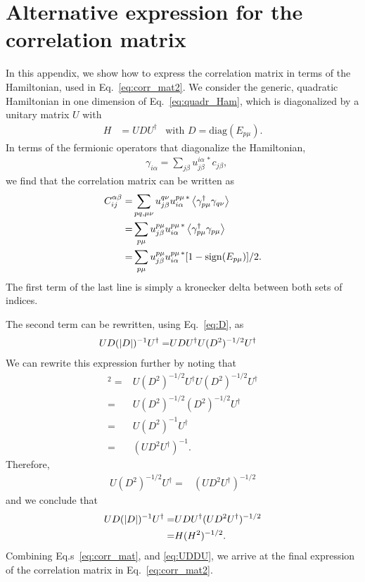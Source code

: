 \documentclass[twocolumn,amsmath,longbibliography,amssymb,superscriptaddress]{revtex4-1}
\begin{document}
\section{Alternative expression for the correlation matrix}\label{app:CM}
In this appendix, we show how to express the correlation matrix in terms of the Hamiltonian, used in Eq.~\eqref{eq:corr_mat2}. 
We consider the generic, quadratic Hamiltonian in one dimension of Eq.~\ref{eq:quadr_Ham}, which is diagonalized by a unitary matrix $U$ with 
	\begin{align}\label{eq:D}
	H&=UDU^\dagger& \mbox{with } D=\mbox{diag}(E_{p\mu}).
	\end{align} 
In terms of the fermionic operators that diagonalize the Hamiltonian, 
\begin{align}
& \gamma_{i\alpha} = \sum_{j\beta}u_{j\beta}^{i\alpha \, \ast} c_{j\beta},
\end{align}
we find that the correlation matrix can be written as 
\begin{align}\label{eq:corr_mat}
C_{ij}^{\alpha \beta} =& \sum_{pq,\mu\nu} u^{q\nu }_{j\beta} u^{p\mu \, \ast}_{i\alpha} \expval{\gamma^\dagger_{p\mu} \gamma_{q\nu} }\nonumber \\
=&  \sum_{p\mu} u^{p\mu }_{j\beta} u^{p\mu \, \ast}_{i\alpha} \expval{\gamma^\dagger_{p\mu} \gamma_{p\mu} }\nonumber \\
=&  \sum_{p\mu} u^{p\mu }_{j\beta} u^{p\mu \, \ast}_{i\alpha} [1-{\rm sign}(E_{p\mu})]/2.
\end{align}
The first term of the last line is simply a kronecker delta between both sets of indices. 

The second term can be rewritten, using Eq.~\ref{eq:D}, as
\begin{align}
UD(\abs{D})^{-1}U^\dagger =& UDU^\dagger U(D^2)^{-1/2}U^\dagger
\end{align}
We can rewrite this expression further by noting that 
\begin{align}
[U (D^2)^{-1/2} U^\dagger]^2 =& U (D^2)^{-1/2} U^\dagger U  (D^2)^{-1/2} U^\dagger \nonumber\\
=&  U (D^2)^{-1/2}  (D^2)^{-1/2} U^\dagger \nonumber\\
=&  U (D^2)^{-1} U^\dagger \nonumber\\
=&  (U D^2 U^\dagger)^{-1}.
\end{align}
Therefore,
\begin{align*}
U (D^2)^{-1/2} U^\dagger =&(U D^2 U^\dagger)^{-1/2} 
\end{align*}
and we conclude that
\begin{align}\label{eq:UDDU}
UD(\abs{D})^{-1}U^\dagger =& UDU^\dagger(U D^2 U^\dagger)^{-1/2} \nonumber\\ 
=& H(H^2)^{-1/2}.
\end{align}
Combining Eq.s~\eqref{eq:corr_mat},  and \eqref{eq:UDDU}, we arrive at the final expression of the correlation matrix in Eq.~\eqref{eq:corr_mat2}. 
\end{document}
